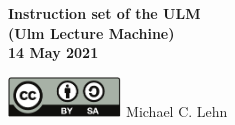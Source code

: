 \begin{titlepage}
   \begin{flushright}
      {\Huge \bfseries
	 Instruction set of the ULM\\
	 (Ulm Lecture Machine) \\
	 14 May 2021 \\
      }

      \vspace*{\fill}

      \href{https://creativecommons.org/licenses/by-sa/4.0/}
      {\includegraphics[width=3cm]{by-sa.pdf}}
      \hspace*{\fill}
      {\huge
	 Michael C. Lehn \\
      }
   \end{flushright}
\end{titlepage}
